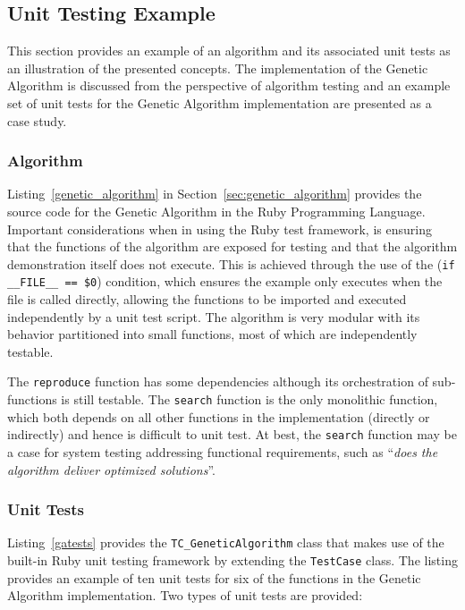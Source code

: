 %
%
\subsection{Unit Testing Example}
\label{sec:example}
This section provides an example of an algorithm and its associated unit tests as an illustration of the presented concepts.
The implementation of the Genetic Algorithm is discussed from the perspective of algorithm testing and an example set of unit tests for the Genetic Algorithm implementation are presented as a case study.

\subsubsection{Algorithm}
\label{subsec:algorithm}
Listing~\ref{genetic_algorithm} in Section~\ref{sec:genetic_algorithm} provides the source code for the Genetic Algorithm in the Ruby Programming Language. Important considerations when in using the Ruby test framework, is ensuring that the functions of the algorithm are exposed for testing and that the algorithm demonstration itself does not execute. This is achieved through the use of the (\texttt{if \_\_FILE\_\_ == \$0}) condition, which ensures the example only executes when the file is called directly, allowing the functions to be imported and executed independently by a unit test script.
The algorithm is very modular with its behavior partitioned into small functions, most of which are independently testable. 

The \texttt{reproduce} function has some dependencies although its orchestration of sub-functions is still testable. The \texttt{search} function is the only monolithic function, which both depends on all other functions in the implementation (directly or indirectly) and hence is difficult to unit test. At best, the \texttt{search} function may be a case for system testing addressing functional requirements, such as ``\emph{does the algorithm deliver optimized solutions}''.


\subsubsection{Unit Tests}
\label{subsec:tests}
Listing~\ref{gatests} provides the \texttt{TC\_GeneticAlgorithm} class that makes use of the built-in Ruby unit testing framework by extending the \texttt{TestCase} class.
The listing provides an example of ten unit tests for six of the functions in the Genetic Algorithm implementation. Two types of unit tests are provided: 

